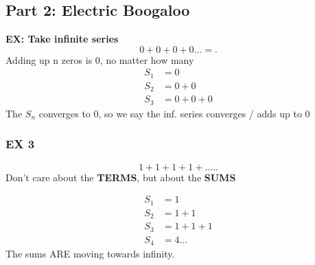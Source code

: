 \documentclass[]{report}
\begin{document}
    \subsection*{Part 2: Electric Boogaloo}
    \textbf{EX: Take infinite series}
    \\
    \[
    0 + 0 + 0 + 0... =
    .\] Adding up n zeros is 0, no matter how many 
    \begin{align}
            S_1 &= 0 \\
            S_2 &= 0+0 \\
            S_3 &= 0+0+0 
    \end{align}
    {The $S_n$ converges to 0, so we say the inf. series converges / adds up to 0 } 
     \subsubsection*{EX 3}
     \[
     1 + 1 + 1 + 1 +....
     .\] Don't care about the \textbf{TERMS}, but about the \textbf{SUMS}

     \begin{align*}
             S_1 &= 1 \\
             S_2 &= 1 + 1 \\
             S_3 &= 1 + 1 + 1 \\
             S_4 &= 4... 
     \end{align*}
     The sums ARE moving towards infinity. 
\end{document}
